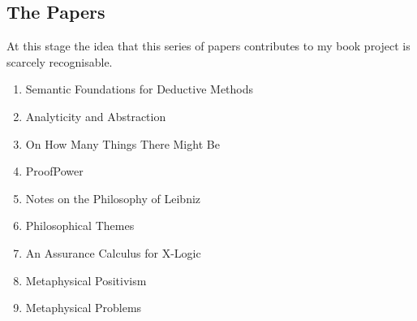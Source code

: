 \documentclass[numreferences]{rbjk}
\begin{document}
\begin{article}
\section{The Papers}

At this stage the idea that this series of papers contributes to my book project is scarcely recognisable.

\begin{enumerate}
\item Semantic Foundations for Deductive Methods \cite{rbjp001}
\item Analyticity and Abstraction \cite{rbjp002}
\item On How Many Things There Might Be \cite{rbjp003}
\item ProofPower \cite{rbjp004}
\item Notes on the Philosophy of Leibniz \cite{rbjp005}
\item Philosophical Themes \cite{rbjp006}
\item An Assurance Calculus for X-Logic \cite{rbjp007}
\item Metaphysical Positivism \cite{rbjp008}
\item Metaphysical Problems \cite{rbjp009}
\end{enumerate}


%

{\raggedright


} %

\end{article}
\end{document}
